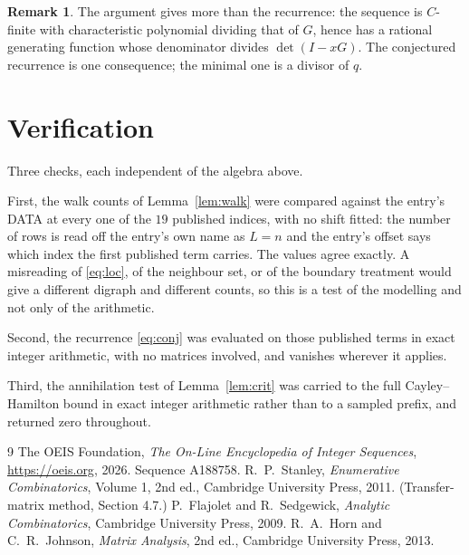 \documentclass[11pt,a4paper]{article}
\theoremstyle{plain}
\theoremstyle{definition}
\newtheorem{remark}[theorem]{Remark}
\begin{document}
\begin{remark}
The argument gives more than the recurrence: the sequence is $C$-finite with characteristic
polynomial dividing that of $G$, hence has a rational generating function whose denominator
divides $\det(I-xG)$. The conjectured recurrence is one consequence; the minimal one is a
divisor of $q$.
\end{remark}

\section{Verification}

Three checks, each independent of the algebra above.

First, the walk counts of Lemma~\ref{lem:walk} were compared against the entry's DATA at
every one of the $19$ published indices, with no shift fitted: the number of rows is
read off the entry's own name as $L=n$ and the entry's offset says which index the first
published term carries. The values agree exactly. A misreading of \eqref{eq:loc}, of the
neighbour set, or of the boundary treatment would give a different digraph and different
counts, so this is a test of the modelling and not only of the arithmetic.

Second, the recurrence \eqref{eq:conj} was evaluated on those published terms in exact
integer arithmetic, with no matrices involved, and vanishes wherever it applies.

Third, the annihilation test of Lemma~\ref{lem:crit} was carried to the full
Cayley--Hamilton bound in exact integer arithmetic rather than to a sampled prefix, and
returned zero throughout.

\begin{thebibliography}{9}
 The OEIS Foundation, \emph{The On-Line Encyclopedia of Integer
Sequences}, \url{https://oeis.org}, 2026. Sequence A188758.
 R.~P.~Stanley, \emph{Enumerative Combinatorics}, Volume 1, 2nd ed.,
Cambridge University Press, 2011. (Transfer-matrix method, Section 4.7.)
 P.~Flajolet and R.~Sedgewick, \emph{Analytic Combinatorics}, Cambridge
University Press, 2009.
 R.~A.~Horn and C.~R.~Johnson, \emph{Matrix Analysis}, 2nd ed., Cambridge
University Press, 2013.
\end{thebibliography}
\end{document}
